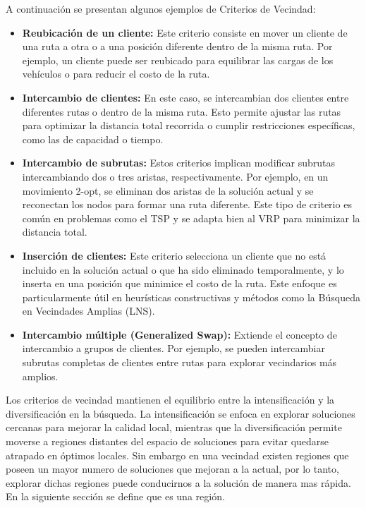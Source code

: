 \documentclass{article}
\begin{document}
A continuación se presentan algunos ejemplos de Criterios de Vecindad:
\begin{itemize}
\item
    \textbf{Reubicación de un cliente:}
    Este criterio consiste en mover un cliente de una ruta a otra o a una posición diferente dentro de la misma ruta. Por ejemplo, un cliente puede ser reubicado para equilibrar las cargas de los vehículos o para reducir el costo de la ruta.
\item
    \textbf{Intercambio de clientes:}
    En este caso, se intercambian dos clientes entre diferentes rutas o dentro de la misma ruta. Esto permite ajustar las rutas para optimizar la distancia total recorrida o cumplir restricciones específicas, como las de capacidad o tiempo.
\item
    \textbf{Intercambio de subrutas:}
    Estos criterios implican modificar subrutas intercambiando dos o tres aristas, respectivamente. Por ejemplo, en un movimiento 2-opt, se eliminan dos aristas de la solución actual y se reconectan los nodos para formar una ruta diferente. Este tipo de criterio es común en problemas como el TSP y se adapta bien al VRP para minimizar la distancia total.
\item
    \textbf{Inserción de clientes:}
    Este criterio selecciona un cliente que no está incluido en la solución actual o que ha sido eliminado temporalmente, y lo inserta en una posición que minimice el costo de la ruta. Este enfoque es particularmente útil en heurísticas constructivas y métodos como la Búsqueda en Vecindades Amplias (LNS).
\item
    \textbf{Intercambio múltiple (Generalized Swap):}
    Extiende el concepto de intercambio a grupos de clientes. Por ejemplo, se pueden intercambiar subrutas completas de clientes entre rutas para explorar vecindarios más amplios.
\end{itemize}

Los criterios de vecindad mantienen el equilibrio entre la intensificación y la diversificación en la búsqueda. La intensificación se enfoca en explorar soluciones cercanas para mejorar la calidad local, mientras que la diversificación permite moverse a regiones distantes del espacio de soluciones para evitar quedarse atrapado en óptimos locales. Sin embargo en una vecindad existen regiones que poseen un mayor numero de soluciones que mejoran a la actual, por lo tanto, explorar dichas regiones puede conducirnos a la solución de manera mas rápida. En la siguiente sección se define que es una región.
\end{document}
